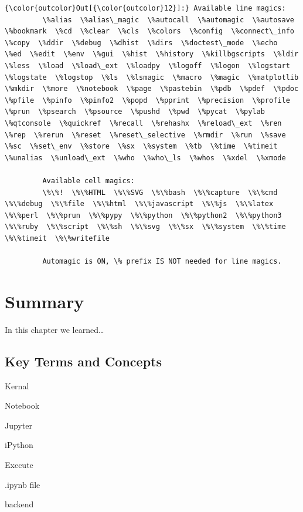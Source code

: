\documentclass{book}
\begin{document}
\begin{Verbatim}[commandchars=\\\{\}]
{\color{outcolor}Out[{\color{outcolor}12}]:} Available line magics:
         \%alias  \%alias\_magic  \%autocall  \%automagic  \%autosave  \%bookmark  \%cd  \%clear  \%cls  \%colors  \%config  \%connect\_info  \%copy  \%ddir  \%debug  \%dhist  \%dirs  \%doctest\_mode  \%echo  \%ed  \%edit  \%env  \%gui  \%hist  \%history  \%killbgscripts  \%ldir  \%less  \%load  \%load\_ext  \%loadpy  \%logoff  \%logon  \%logstart  \%logstate  \%logstop  \%ls  \%lsmagic  \%macro  \%magic  \%matplotlib  \%mkdir  \%more  \%notebook  \%page  \%pastebin  \%pdb  \%pdef  \%pdoc  \%pfile  \%pinfo  \%pinfo2  \%popd  \%pprint  \%precision  \%profile  \%prun  \%psearch  \%psource  \%pushd  \%pwd  \%pycat  \%pylab  \%qtconsole  \%quickref  \%recall  \%rehashx  \%reload\_ext  \%ren  \%rep  \%rerun  \%reset  \%reset\_selective  \%rmdir  \%run  \%save  \%sc  \%set\_env  \%store  \%sx  \%system  \%tb  \%time  \%timeit  \%unalias  \%unload\_ext  \%who  \%who\_ls  \%whos  \%xdel  \%xmode
         
         Available cell magics:
         \%\%!  \%\%HTML  \%\%SVG  \%\%bash  \%\%capture  \%\%cmd  \%\%debug  \%\%file  \%\%html  \%\%javascript  \%\%js  \%\%latex  \%\%perl  \%\%prun  \%\%pypy  \%\%python  \%\%python2  \%\%python3  \%\%ruby  \%\%script  \%\%sh  \%\%svg  \%\%sx  \%\%system  \%\%time  \%\%timeit  \%\%writefile
         
         Automagic is ON, \% prefix IS NOT needed for line magics.
\end{Verbatim}
            
    \section{Summary}\label{summary}

    In this chapter we learned\ldots{}

    \subsection{Key Terms and Concepts}\label{key-terms-and-concepts}

    Kernal

Notebook

Jupyter

iPython

Execute

.ipynb file

backend
\end{document}
